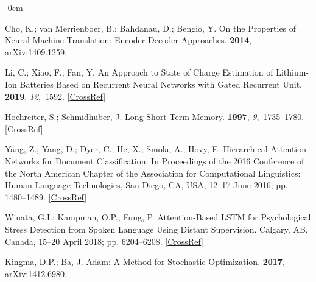 \documentclass[energies,article,accept,pdftex,moreauthors]{Definitions/mdpi}
\begin{document}
\begin{adjustwidth}{-\extralength}{0cm}
\begin{thebibliography}{999}
    Cho, K.; van Merrienboer, B.; Bahdanau, D.; Bengio, Y.
    \newblock On the {Properties} of {Neural} {Machine} {Translation}:
    {Encoder}-{Decoder} {Approaches}.
     {\bf 2014}, arXiv:1409.1259.
    
    
    Li, C.; Xiao, F.; Fan, Y.
    \newblock An {Approach} to {State} of {Charge} {Estimation} of {Lithium}-{Ion}
    {Batteries} {Based} on {Recurrent} {Neural} {Networks} with {Gated}
    {Recurrent} {Unit}.
     {\bf 2019}, {\em 12},~1592. [\href{http://dx.doi.org/10.3390/en12091592}{CrossRef}]
    
    Hochreiter, S.; Schmidhuber, J.
    \newblock Long Short-Term Memory.
     {\bf 1997}, {\em 9},~1735--1780.
     [\href{http://dx.doi.org/10.1162/neco.1997.9.8.1735}{CrossRef}]
    
    Yang, Z.; Yang, D.; Dyer, C.; He, X.; Smola, A.; Hovy, E.
    \newblock Hierarchical {Attention} {Networks} for {Document} {Classification}.
    \newblock In Proceedings of the 2016 {Conference} of the
    {North} {American} {Chapter} of the {Association} for {Computational}
    {Linguistics}: {Human} {Language} {Technologies}, San Diego, CA, USA, 12--17 June 2016; pp. 1480--1489. [\href{http://dx.doi.org/10.18653/v1/N16-1174}{CrossRef}]
    
    Winata, G.I.; Kampman, O.P.; Fung, P.
    \newblock Attention-{Based} {LSTM} for {Psychological} {Stress} {Detection}
    from {Spoken} {Language} {Using} {Distant} {Supervision}.
     Calgary, AB, Canada, 15--20 April 2018; pp. 6204--6208. [\href{http://dx.doi.org/10.1109/ICASSP.2018.8461990}{CrossRef}]
    
    Kingma, D.P.; Ba, J.
    \newblock Adam: {A} {Method} for {Stochastic} {Optimization}.
     {\bf 2017},
    \newblock arXiv:1412.6980.
    

\end{thebibliography}
\end{adjustwidth}
\end{document}
